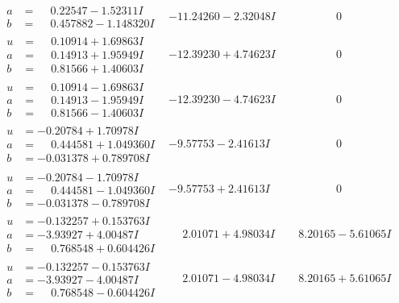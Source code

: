 \documentclass[1p]{elsarticle_modified}
\theoremstyle{definition}
\begin{document}
$$\begin{array}{c|c|c}
\begin{aligned}
a &= \phantom{-}0.22547 - 1.52311 I \\
b &= \phantom{-}0.457882 - 1.148320 I\end{aligned}
 & -11.24260 - 2.32048 I & \phantom{-0.000000 } 0 \\ \hline\begin{aligned}
u &= \phantom{-}0.10914 + 1.69863 I \\
a &= \phantom{-}0.14913 + 1.95949 I \\
b &= \phantom{-}0.81566 + 1.40603 I\end{aligned}
 & -12.39230 + 4.74623 I & \phantom{-0.000000 } 0 \\ \hline\begin{aligned}
u &= \phantom{-}0.10914 - 1.69863 I \\
a &= \phantom{-}0.14913 - 1.95949 I \\
b &= \phantom{-}0.81566 - 1.40603 I\end{aligned}
 & -12.39230 - 4.74623 I & \phantom{-0.000000 } 0 \\ \hline\begin{aligned}
u &= -0.20784 + 1.70978 I \\
a &= \phantom{-}0.444581 + 1.049360 I \\
b &= -0.031378 + 0.789708 I\end{aligned}
 & -9.57753 - 2.41613 I & \phantom{-0.000000 } 0 \\ \hline\begin{aligned}
u &= -0.20784 - 1.70978 I \\
a &= \phantom{-}0.444581 - 1.049360 I \\
b &= -0.031378 - 0.789708 I\end{aligned}
 & -9.57753 + 2.41613 I & \phantom{-0.000000 } 0 \\ \hline\begin{aligned}
u &= -0.132257 + 0.153763 I \\
a &= -3.93927 + 4.00487 I \\
b &= \phantom{-}0.768548 + 0.604426 I\end{aligned}
 & \phantom{-}2.01071 + 4.98034 I & \phantom{-}8.20165 - 5.61065 I \\ \hline\begin{aligned}
u &= -0.132257 - 0.153763 I \\
a &= -3.93927 - 4.00487 I \\
b &= \phantom{-}0.768548 - 0.604426 I\end{aligned}
 & \phantom{-}2.01071 - 4.98034 I & \phantom{-}8.20165 + 5.61065 I \\ \hline\begin{aligned}

\end{aligned}
\end{array}$$
\end{document}
